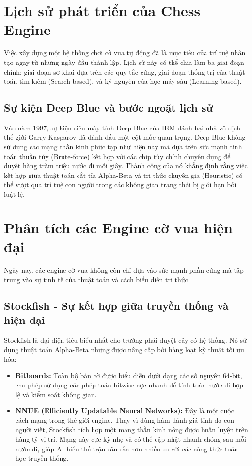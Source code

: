 \section{Lịch sử phát triển của Chess Engine}

Việc xây dựng một hệ thống chơi cờ vua tự động đã là mục tiêu của trí tuệ nhân tạo ngay từ những ngày đầu thành lập. Lịch sử này có thể chia làm ba giai đoạn chính: giai đoạn sơ khai dựa trên các quy tắc cứng, giai đoạn thống trị của thuật toán tìm kiếm (Search-based), và kỷ nguyên của học máy sâu (Learning-based).

\subsection{Sự kiện Deep Blue và bước ngoặt lịch sử}
Vào năm 1997, sự kiện siêu máy tính Deep Blue của IBM đánh bại nhà vô địch thế giới Garry Kasparov đã đánh dấu một cột mốc quan trọng. Deep Blue không sử dụng các mạng thần kinh phức tạp như hiện nay mà dựa trên sức mạnh tính toán thuần túy (Brute-force) kết hợp với các chip tùy chỉnh chuyên dụng để duyệt hàng trăm triệu nước đi mỗi giây. Thành công của nó khẳng định rằng việc kết hợp giữa thuật toán cắt tỉa Alpha-Beta và tri thức chuyên gia (Heuristic) có thể vượt qua trí tuệ con người trong các không gian trạng thái bị giới hạn bởi luật lệ.

\section{Phân tích các Engine cờ vua hiện đại}

Ngày nay, các engine cờ vua không còn chỉ dựa vào sức mạnh phần cứng mà tập trung vào sự tinh tế của thuật toán và cách biểu diễn tri thức.

\subsection{Stockfish - Sự kết hợp giữa truyền thống và hiện đại}
Stockfish là đại diện tiêu biểu nhất cho trường phái duyệt cây có hệ thống. Nó sử dụng thuật toán Alpha-Beta nhưng được nâng cấp bởi hàng loạt kỹ thuật tối ưu hóa:
\begin{itemize}
    \item \textbf{Bitboards:} Toàn bộ bàn cờ được biểu diễn dưới dạng các số nguyên 64-bit, cho phép sử dụng các phép toán bitwise cực nhanh để tính toán nước đi hợp lệ và kiểm soát không gian.
    \item \textbf{NNUE (Efficiently Updatable Neural Networks):} Đây là một cuộc cách mạng trong thế giới engine. Thay vì dùng hàm đánh giá tĩnh do con người viết, Stockfish tích hợp một mạng thần kinh nông được huấn luyện trên hàng tỷ vị trí. Mạng này cực kỳ nhẹ và có thể cập nhật nhanh chóng sau mỗi nước đi, giúp AI hiểu thế trận sâu sắc hơn nhiều so với các công thức toán học truyền thống.
\end{itemize}

